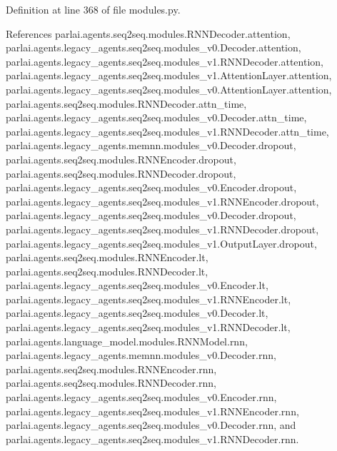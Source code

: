 Definition at line 368 of file modules.\+py.



References parlai.\+agents.\+seq2seq.\+modules.\+R\+N\+N\+Decoder.\+attention, parlai.\+agents.\+legacy\+\_\+agents.\+seq2seq.\+modules\+\_\+v0.\+Decoder.\+attention, parlai.\+agents.\+legacy\+\_\+agents.\+seq2seq.\+modules\+\_\+v1.\+R\+N\+N\+Decoder.\+attention, parlai.\+agents.\+legacy\+\_\+agents.\+seq2seq.\+modules\+\_\+v1.\+Attention\+Layer.\+attention, parlai.\+agents.\+legacy\+\_\+agents.\+seq2seq.\+modules\+\_\+v0.\+Attention\+Layer.\+attention, parlai.\+agents.\+seq2seq.\+modules.\+R\+N\+N\+Decoder.\+attn\+\_\+time, parlai.\+agents.\+legacy\+\_\+agents.\+seq2seq.\+modules\+\_\+v0.\+Decoder.\+attn\+\_\+time, parlai.\+agents.\+legacy\+\_\+agents.\+seq2seq.\+modules\+\_\+v1.\+R\+N\+N\+Decoder.\+attn\+\_\+time, parlai.\+agents.\+legacy\+\_\+agents.\+memnn.\+modules\+\_\+v0.\+Decoder.\+dropout, parlai.\+agents.\+seq2seq.\+modules.\+R\+N\+N\+Encoder.\+dropout, parlai.\+agents.\+seq2seq.\+modules.\+R\+N\+N\+Decoder.\+dropout, parlai.\+agents.\+legacy\+\_\+agents.\+seq2seq.\+modules\+\_\+v0.\+Encoder.\+dropout, parlai.\+agents.\+legacy\+\_\+agents.\+seq2seq.\+modules\+\_\+v1.\+R\+N\+N\+Encoder.\+dropout, parlai.\+agents.\+legacy\+\_\+agents.\+seq2seq.\+modules\+\_\+v0.\+Decoder.\+dropout, parlai.\+agents.\+legacy\+\_\+agents.\+seq2seq.\+modules\+\_\+v1.\+R\+N\+N\+Decoder.\+dropout, parlai.\+agents.\+legacy\+\_\+agents.\+seq2seq.\+modules\+\_\+v1.\+Output\+Layer.\+dropout, parlai.\+agents.\+seq2seq.\+modules.\+R\+N\+N\+Encoder.\+lt, parlai.\+agents.\+seq2seq.\+modules.\+R\+N\+N\+Decoder.\+lt, parlai.\+agents.\+legacy\+\_\+agents.\+seq2seq.\+modules\+\_\+v0.\+Encoder.\+lt, parlai.\+agents.\+legacy\+\_\+agents.\+seq2seq.\+modules\+\_\+v1.\+R\+N\+N\+Encoder.\+lt, parlai.\+agents.\+legacy\+\_\+agents.\+seq2seq.\+modules\+\_\+v0.\+Decoder.\+lt, parlai.\+agents.\+legacy\+\_\+agents.\+seq2seq.\+modules\+\_\+v1.\+R\+N\+N\+Decoder.\+lt, parlai.\+agents.\+language\+\_\+model.\+modules.\+R\+N\+N\+Model.\+rnn, parlai.\+agents.\+legacy\+\_\+agents.\+memnn.\+modules\+\_\+v0.\+Decoder.\+rnn, parlai.\+agents.\+seq2seq.\+modules.\+R\+N\+N\+Encoder.\+rnn, parlai.\+agents.\+seq2seq.\+modules.\+R\+N\+N\+Decoder.\+rnn, parlai.\+agents.\+legacy\+\_\+agents.\+seq2seq.\+modules\+\_\+v0.\+Encoder.\+rnn, parlai.\+agents.\+legacy\+\_\+agents.\+seq2seq.\+modules\+\_\+v1.\+R\+N\+N\+Encoder.\+rnn, parlai.\+agents.\+legacy\+\_\+agents.\+seq2seq.\+modules\+\_\+v0.\+Decoder.\+rnn, and parlai.\+agents.\+legacy\+\_\+agents.\+seq2seq.\+modules\+\_\+v1.\+R\+N\+N\+Decoder.\+rnn.



